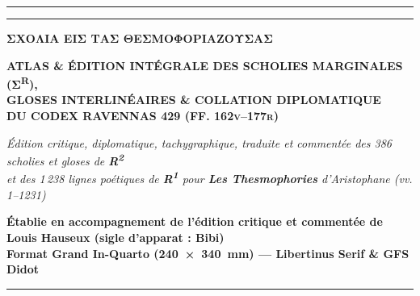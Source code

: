 \documentclass[11pt,twoside]{book}
\newcommand{\expo}[1]{\textsuperscript{#1}}
\newlength{\larg}
\begin{document}
\thispagestyle{empty}
\vspace*{0.8cm}
\begin{center}
  {\color{ruleGold}\rule{\textwidth}{1.4pt}}\par\vspace{2.5pt}
  {\color{ruleGold}\rule{\textwidth}{0.5pt}}\par\vspace{0.7cm}

  {\fontsize{26pt}{32pt}\selectfont\bfseries\color{rubricRed}\policeGr ΣΧΟΛΙΑ ΕΙΣ ΤΑΣ ΘΕΣΜΟΦΟΡΙΑΖΟΥΣΑΣ}\par\vspace{0.35cm}
  {\fontsize{21pt}{26pt}\selectfont\scshape\bfseries ATLAS \& ÉDITION INTÉGRALE DES SCHOLIES MARGINALES ({\policeGr Σ}\expo{R}),\\GLOSES INTERLINÉAIRES \& COLLATION DIPLOMATIQUE\\DU CODEX RAVENNAS 429 (FF. 162v–177r)}\par\vspace{0.35cm}
  {\large\itshape\color{sepiaNote}Édition critique, diplomatique, tachygraphique, traduite et commentée des 386 scholies et gloses de \textbf{R\expo{2}}\\et des 1\,238 lignes poétiques de \textbf{R\expo{1}} pour \textbf{Les Thesmophories} d'Aristophane (vv. 1–1231)}\par\vspace{0.22cm}
  {\normalsize\bfseries\color{rubricRed}Établie en accompagnement de l'édition critique et commentée de Louis Hauseux (sigle d'apparat : \textbf{Bibi})\\Format Grand In-Quarto (240~×~340~mm) — Libertinus Serif \& GFS Didot}\par\vspace{0.6cm}

  {\color{ruleGold}\rule{0.50\textwidth}{0.6pt}}\par\vspace{0.6cm}
\end{center}
\end{document}
